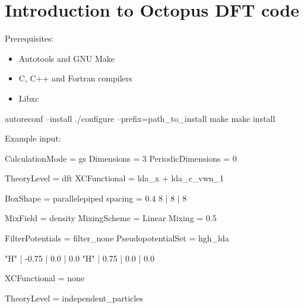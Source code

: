 \chapter{Introduction to \textsf{Octopus} DFT code}

Prerequisites:
\begin{itemize}
\item Autotools and GNU Make
\item C, C++ and Fortran compilers
\item Libxc
\end{itemize}

\begin{bashcode}
autoreconf --install
./configure --prefix=path_to_install
make
make install
\end{bashcode}

Example input:
\begin{textcode}
CalculationMode = gs
Dimensions = 3
PeriodicDimensions = 0

TheoryLevel = dft
XCFunctional = lda_x + lda_c_vwn_1

BoxShape = parallelepiped
spacing = 0.4
 8 | 8 | 8
%

MixField = density
MixingScheme = Linear
Mixing = 0.5    

FilterPotentials = filter_none    
PseudopotentialSet = hgh_lda
    
  "H" | -0.75 | 0.0 | 0.0
  "H" |  0.75 | 0.0 | 0.0
%    
\end{textcode}

\begin{textcode}
XCFunctional = none
\end{textcode}

\begin{textcode}
TheoryLevel = independent_particles
\end{textcode}